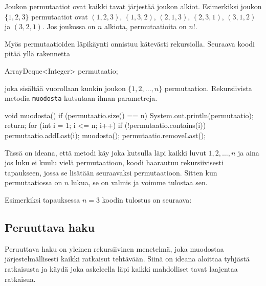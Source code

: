 Joukon permutaatiot ovat kaikki tavat järjestää joukon alkiot.
Esimerkiksi joukon $\{1,2,3\}$ permutaatiot ovat
$(1,2,3)$, $(1,3,2)$, $(2,1,3)$, $(2,3,1)$, $(3,1,2)$ ja $(3,2,1)$.
Jos joukossa on $n$ alkiota, permutaatioita on $n!$.

Myös permutaatioiden läpikäynti onnistuu kätevästi rekursiolla.
Seuraava koodi pitää yllä rakennetta

\begin{code}
ArrayDeque<Integer> permutaatio;
\end{code}

joka sisältää vuorollaan kunkin joukon $\{1,2,\dots,n\}$ permutaation.
Rekursiivista metodia \texttt{muodosta} kutsutaan ilman parametreja.

\begin{code}
void muodosta() {
    if (permutaatio.size() == n) {
        System.out.println(permutaatio);
        return;
    }
    for (int i = 1; i <= n; i++) {
        if (!permutaatio.contains(i)) {
            permutaatio.addLast(i);
            muodosta();
            permutaatio.removeLast();
        }
    }
}
\end{code}

Tässä on ideana, että metodi käy joka kutsulla läpi kaikki luvut
$1,2,\dots,n$ ja aina jos luku ei kuulu vielä permutaatioon,
koodi haarautuu rekursiivisesti tapaukseen, jossa se lisätään
seuraavaksi permutaatioon.
Sitten kun permutaatiossa on $n$ lukua, se on valmis ja
voimme tulostaa sen.

Esimerkiksi tapauksessa $n=3$ koodin tulostus on seuraava:

\begin{code}
[1, 2, 3]
[1, 3, 2]
[2, 1, 3]
[2, 3, 1]
[3, 1, 2]
[3, 2, 1]
\end{code}

\subsection{Peruuttava haku}

Peruuttava haku on yleinen rekursiivinen menetelmä,
joka muodostaa järjes\-telmällisesti kaikki ratkaisut tehtävään.
Siinä on ideana aloittaa tyhjästä ratkaisusta ja käydä
joka askeleella läpi kaikki mahdolliset tavat laajentaa ratkaisua.

